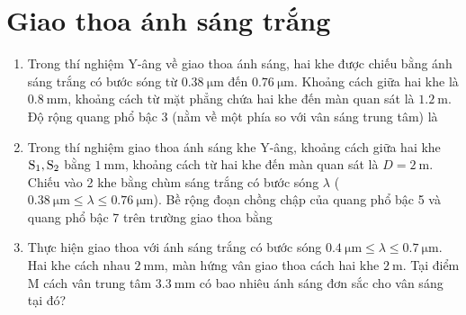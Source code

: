 \section{Giao thoa ánh sáng trắng}
\begin{enumerate}
	\item
	{
		Trong thí nghiệm Y-âng về giao thoa ánh sáng, hai khe được chiếu bằng ánh sáng trắng có bước sóng từ $\SI{0.38}{\micro \meter}$ đến $\SI{0.76}{\micro \meter}$. Khoảng cách giữa hai khe là $\SI{0.8}{\milli \meter}$, khoảng cách từ mặt phẳng chứa hai khe đến màn quan sát là $\SI{1.2}{\meter}$. Độ rộng quang phổ bậc 3 (nằm về một phía so với vân sáng trung tâm) là
	}
		\item
	{
		Trong thí nghiệm giao thoa ánh sáng khe Y-âng, khoảng cách giữa hai khe $\text S_1, \text S_2$ bằng $\SI{1}{\milli \meter}$, khoảng cách từ hai khe đến màn quan sát là $D=\SI{2}{\meter}$. Chiếu vào 2 khe bằng chùm sáng trắng có bước sóng $\lambda$ ($\SI{0.38}{\micro \meter} \leq \lambda \leq \SI{0.76}{\micro \meter}$). Bề rộng đoạn chồng chập của quang phổ bậc 5 và quang phổ bậc 7 trên trường giao thoa bằng
	}
		\item
	{
		Thực hiện giao thoa với ánh sáng trắng có bước sóng $\SI{0.4}{\micro \meter} \leq \lambda \leq \SI{0.7}{\micro \meter}$. Hai khe cách nhau $\SI{2}{\milli \meter}$, màn hứng vân giao thoa cách hai khe $\SI{2}{\meter}$. Tại điểm M cách vân trung tâm $\SI{3.3}{\milli \meter}$ có bao nhiêu ánh sáng đơn sắc cho vân sáng tại đó?
		}
\end{enumerate}
